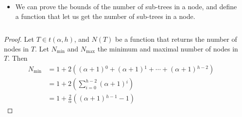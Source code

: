\begin{frame}[allowframebreaks]
\begin{columns}
\begin{column}{\textlecolumn}
\begin{block}{}
            \end{block}
        \end{column}
    \end{columns}
    \framebreak{}
    \begin{columns}
        \begin{column}{\textlecolumn}
            \begin{block}{}
                \vspace{-0.5cm}
                \begin{itemize}
                    \item We can prove the bounds of the number of sub-trees in a node, and define a function that let us get the number of sub-trees in a node.
                \end{itemize}
            \end{block}
        \end{column}
        \begin{column}{\textricolumn}
        \end{column}
    \end{columns}
    \begin{columns}
        \begin{column}{0.45\textwidth}
            \begin{block}{}
                \begin{proof}\renewcommand{\qedsymbol}{}
                    Let \(T \in t\left(\alpha, h\right)\), and \(N(T)\) be a function that returns the number of nodes in \(T\).
                    Let \(N_{\text{min}}\) and \(N_{\text{max}}\) the minimum and maximal number of nodes in \(T\). Then
                    \[
                        \begin{aligned}
                            N_{\text{min}} &= 1 + 2\left(\left(\alpha + 1\right){}^0 + \left(\alpha + 1\right){}^1 + \cdots + \left(\alpha + 1\right){}^{h-2} \right) \\
                            & = 1 + 2\left(\sum^{h - 2}_{i = 0} \left(\alpha + 1\right){}^i \right) \\
                            & = 1 + \frac{2}{\alpha}\left(\left(\alpha + 1\right){}^{h - 1} - 1\right)
                        \end{aligned}
                    \]
                \end{proof}
            \end{block}
        \end{column}
        \begin{column}{0.6\textwidth}

\end{column}
\end{columns}
\end{frame}
